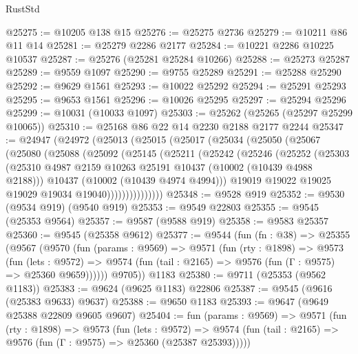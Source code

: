 \begin{lexlean}{RustStd}
\begin{coremodule}
@25275 := @10205 @138 @15
@25276 := @25275 @2736
@25279 := @10211 @86 @11 @14
@25281 := @25279 @2286 @2177
@25284 := @10221 @2286 @10225 @10537
@25287 := @25276 (@25281 @25284 @10266)
@25288 := @25273 @25287
@25289 := @9559 @1097
@25290 := @9755 @25289
@25291 := @25288 @25290
@25292 := @9629 @1561
@25293 := @10022 @25292
@25294 := @25291 @25293
@25295 := @9653 @1561
@25296 := @10026 @25295
@25297 := @25294 @25296
@25299 := @10031 (@10033 @1097)
@25303 := @25262 (@25265 (@25297 @25299 @10065))
@25310 := @25168 @86 @22 @14 @2230 @2188 @2177 @2244
@25347 := @24947
    (@24972
      (@25013
        (@25015
          (@25017
            (@25034
              (@25050
                (@25067
                  (@25080
                    (@25088
                      (@25092
                        (@25145
                          (@25211
                            (@25242
                              (@25246
                                (@25252
                                  (@25303
                                    (@25310
                                      @4987
                                      @2159
                                      @10263
                                      @25191
                                      @10437
                                      (@10002 (@10439 @4988 @2188)))
                                    @10437
                                    (@10002 (@10439 @4974 @4994)))
                                  @19019
                                  @19022
                                  @19025
                                  @19029
                                  @19034
                                  @19040)))))))))))))))
@25348 := @9528 @919
@25352 := @9530 (@9534 @919) (@9540 @919)
@25353 := @9549 @22803
@25355 := @9545 (@25353 @9564)
@25357 := @9587 (@9588 @919)
@25358 := @9583 @25357
@25360 := @9545 (@25358 @9612)
@25377 := @9544
    (fun (fn : @38) =>
    @25355
      (@9567
        (@9570
          (fun (params : @9569) =>
          @9571
            (fun (rty : @1898) =>
            @9573
              (fun (lets : @9572) =>
              @9574 (fun (tail : @2165) => @9576 (fun (Γ : @9575) => @25360 @9659))))))
        @9705))
    @1183
@25380 := @9711 (@25353 (@9562 @1183))
@25383 := @9624 (@9625 @1183) @22806
@25387 := @9545 (@9616 (@25383 @9633) @9637)
@25388 := @9650 @1183
@25393 := @9647 (@9649 @25388 @22809 @9605 @9607)
@25404 := fun (params : @9569) =>
  @9571
    (fun (rty : @1898) =>
    @9573
      (fun (lets : @9572) =>
      @9574 (fun (tail : @2165) => @9576 (fun (Γ : @9575) => @25360 (@25387 @25393)))))

\end{coremodule}
\end{lexlean}
